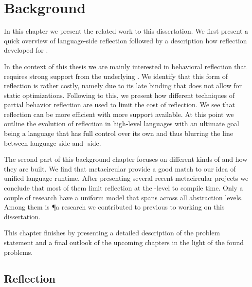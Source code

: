 
\chapter{Background}
\minitoc
\introduction
In this chapter we present the related work to this dissertation.
We first present a quick overview of language-side reflection followed by a description how reflection developed for \VMs.

In the context of this thesis we are mainly interested in behavioral reflection that requires strong support from the underlying \VM.
We identify that this form of reflection is rather costly, namely due to its late binding that does not allow for static optimizations.
Following to this, we present how different techniques of partial behavior reflection are used to limit the cost of reflection.
We see that reflection can be more efficient with more \VM support available.
At this point we outline the evolution of reflection in high-level languages with an ultimate goal being a language that has full control over its own \VM and thus blurring the line between language-side and \VM-side.

The second part of this background chapter focuses on different kinds of \VMs and how they are built.
We find that metacircular \VMs provide a good match to our idea of unified language runtime. 
After presenting several recent metacircular \VM projects we conclude that most of them limit reflection at the \VM-level to compile time.
Only a couple of research \VMs have a uniform model that spans across all abstraction levels.
Among them is \P a research \ST \VM we contributed to previous to working on this dissertation.

This chapter finishes by presenting a detailed description of the problem statement and a final outlook of the upcoming chapters in the light of the found problems.
	
	
\newpage
\section{Reflection}

